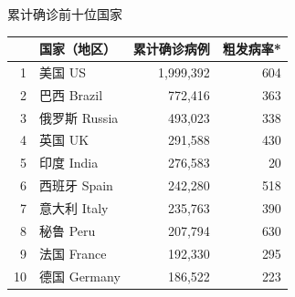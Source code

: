 \documentclass[
]{article}
\begin{document}
\begin{table}[H]
    
    \begin{minipage}{.4\linewidth}
    \centering
    \captionsetup{justification=centering}
    \caption{累计确诊前十位国家}
      \vspace{-0.5\baselineskip}
      \centering
      \captionsetup{justification=centering} \begin{table}[H]
\centering\begingroup\fontsize{12}{14}\selectfont

\begin{tabular}{rlrr}
\toprule
  & 国家（地区） & 累计确诊病例 & 粗发病率*\\
\midrule
\rowcolor{gray!6}  1 & 美国 US & 1,999,392 & 604\\
2 & 巴西 Brazil & 772,416 & 363\\
\rowcolor{gray!6}  3 & 俄罗斯 Russia & 493,023 & 338\\
4 & 英国 UK & 291,588 & 430\\
\rowcolor{gray!6}  5 & 印度 India & 276,583 & 20\\
6 & 西班牙 Spain & 242,280 & 518\\
\rowcolor{gray!6}  7 & 意大利 Italy & 235,763 & 390\\
8 & 秘鲁 Peru & 207,794 & 630\\
\rowcolor{gray!6}  9 & 法国 France & 192,330 & 295\\
10 & 德国 Germany & 186,522 & 223\\
\bottomrule
\end{tabular}
\endgroup{}
\end{table} \end{minipage}
    \begin{minipage}{.7\linewidth}
    \centering
    \captionsetup{justification=centering}
     \caption{粗发病率前十位国家}
     \vspace{-0.5\baselineskip}
      \centering
    \captionsetup{justification=centering} \begin{table}[H]
\centering\begingroup\fontsize{12}{14}\selectfont


\end{table}
\end{minipage}
\end{table}
\end{document}
